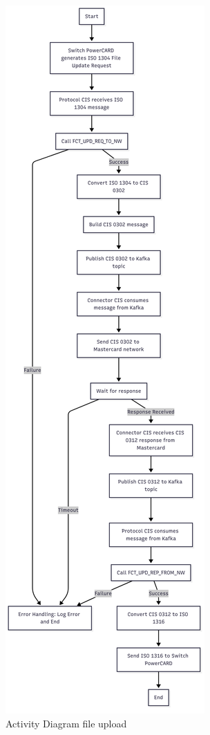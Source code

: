 \documentclass[12pt,a4paper]{report}
\begin{document}
\begin{figure}[H]
\centering
\includegraphics[width=\textwidth,height=0.85\textheight,keepaspectratio]{media/file-upload-activity.png}
\caption{Activity Diagram  file upload}
\label{fig:DFileUp}
\end{figure}
\end{document}
